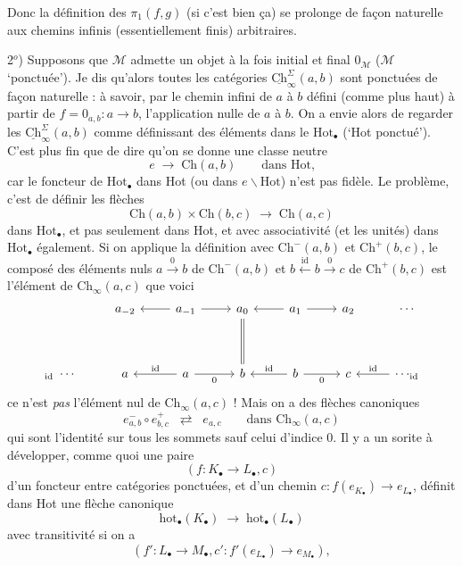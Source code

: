 \documentclass[11pt]{article}
\newcommand{\printedpage}[1]{\marginpar{\footnotesize p.~#1}}
\newcommand{\msp}[1]{\marginpar{\footnotesize [#1]}}
\newcommand{\Ch}{\mathrm{Ch}}
\newcommand{\Hot}{\mathrm{Hot}}
\newcommand{\M}{\mathcal{M}}
\newcommand{\uCh}{\underline{\mathrm{Ch}}}
\begin{document}
\msp{page 15}

Donc la définition des $\pi_1(f,g)$ (si c'est bien ça) se prolonge de façon naturelle aux chemins infinis (essentiellement finis) arbitraires.

2$^o$) Supposons que $\M$ admette un objet à la fois initial et final $0_{\M}$ ($\M$ `ponctuée'). Je dis qu'alors toutes les catégories $\uCh^{\Sigma}_{\infty}(a,b)$ sont ponctuées de façon naturelle : à savoir, par le chemin infini de $a$ à $b$ défini (comme plus haut) à partir de $f = 0_{a,b} : a \longrightarrow b$, l'application nulle de $a$ à $b$. On a envie alors de regarder les $\uCh^{\Sigma}_{\infty}(a,b)$ comme définissant des éléments dans le $\Hot_{\bullet}$ (`Hot ponctué'). C'est plus fin que de dire qu'on se donne une classe neutre
\[
e \;\longrightarrow\; \Ch(a,b) \qquad \text{dans Hot,}
\]
car le foncteur de $\Hot_{\bullet}$ dans Hot (ou dans $e\backslash\Hot$) n'est pas fidèle. Le problème, c'est de définir les flèches
\[
\Ch(a,b)\times\Ch(b,c) \;\longrightarrow\; \Ch(a,c)
\]
dans $\Hot_{\bullet}$, et pas seulement dans Hot, et avec associativité (et les unités) dans $\Hot_{\bullet}$ également. Si on applique la définition avec $\Ch^{-}(a,b)$ et $\Ch^{+}(b,c)$, le composé des éléments nuls $a \xrightarrow{\ 0\ } b$ de $\Ch^{-}(a,b)$ et $b \xleftarrow{\ \mathrm{id}\ } b \xrightarrow{\ 0\ } c$ de $\Ch^{+}(b,c)$
\printedpage{10}
\msp{page 16}
est l'élément de $\Ch_{\infty}(a,c)$ que voici
\[
\begin{tikzcd}[row sep=huge]
 & a_{-2} & a_{-1} \arrow[l] \arrow[r] & a_{0} \arrow[d, equal] & a_{1} \arrow[l] \arrow[r] & a_{2} & \cdots \\
{}_{\mathrm{id}}\ \cdots & a & a \arrow[l, "\mathrm{id}"'] \arrow[r, "0"'] & b & b \arrow[l, "\mathrm{id}"'] \arrow[r, "0"'] & c & \cdots_{\mathrm{id}} \arrow[l, "\mathrm{id}"']
\end{tikzcd}
\]
ce n'est \textit{pas} l'élément nul de $\Ch_{\infty}(a,c)$ ! Mais on a des flèches canoniques
\[
e^{-}_{a,b}\circ e^{+}_{b,c} \;\;\rightleftarrows\;\; e_{a,c} \qquad \text{dans } \Ch_{\infty}(a,c)
\]
qui sont l'identité sur tous les sommets sauf celui d'indice 0. Il y a un sorite à développer, comme quoi une paire
\[
(f : K_{\bullet} \longrightarrow L_{\bullet}, c)
\]
d'un foncteur entre catégories ponctuées, et d'un chemin $c : f(e_{K_{\bullet}}) \longrightarrow e_{L_{\bullet}}$, définit dans Hot une flèche canonique
\[
\mathrm{hot}_{\bullet}(K_{\bullet}) \;\longrightarrow\; \mathrm{hot}_{\bullet}(L_{\bullet})
\]
avec transitivité si on a
\[
(f' : L_{\bullet} \longrightarrow M_{\bullet}, c' : f'(e_{L_{\bullet}}) \longrightarrow e_{M_{\bullet}}),
\]
\end{document}
